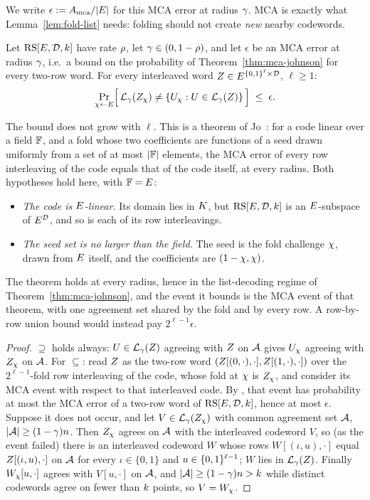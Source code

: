 We write $\epsilon := A_{\mathrm{mca}}/|E|$ for this MCA error at radius $\gamma$. MCA is exactly what Lemma~\ref{lem:fold-list} needs: folding should not create \emph{new} nearby codewords.

\begin{lemma}\label{lem:fold-list}
Let $\mathrm{RS}[E,\mathcal{D},k]$ have rate $\rho$, let $\gamma \in (0, 1-\rho)$, and let $\epsilon$ be an MCA error at radius $\gamma$, i.e.\ a bound on the probability of Theorem~\ref{thm:mca-johnson} for every two-row word. For every interleaved word $Z \in E^{\{0,1\}^{\ell} \times \mathcal{D}}$, $\ell \ge 1$:
\[
\Pr_{\chi \leftarrow E}\Bigl[\, \mathcal{L}_\gamma(Z_\chi) \neq \{ U_\chi : U \in \mathcal{L}_\gamma(Z) \} \,\Bigr] \;\le\; \epsilon .
\]
\end{lemma}

The bound does not grow with $\ell$. This is a theorem of Jo~\cite[Thm.~4.4]{Jo26}: for a code linear over a field $\mathbb{F}$, and a fold whose two coefficients are functions of a seed drawn uniformly from a set of at most $|\mathbb{F}|$ elements, the MCA error of every row interleaving of the code equals that of the code itself, at every radius. Both hypotheses hold here, with $\mathbb{F} = E$:
\begin{itemize}[itemsep=1pt]
\item \emph{The code is $E$-linear.} Its domain lies in $K$, but $\mathrm{RS}[E,\mathcal{D},k]$ is an $E$-subspace of $E^{\mathcal{D}}$, and so is each of its row interleavings.
\item \emph{The seed set is no larger than the field.} The seed is the fold challenge $\chi$, drawn from $E$ itself, and the coefficients are $(1-\chi, \chi)$.
\end{itemize}
The theorem holds at every radius, hence in the list-decoding regime of Theorem~\ref{thm:mca-johnson}, and the event it bounds is the MCA event of that theorem, with one agreement set shared by the fold and by every row. A row-by-row union bound would instead pay $2^{\ell-1}\epsilon$.

\begin{proof}
$\supseteq$ holds always: $U \in \mathcal{L}_\gamma(Z)$ agreeing with $Z$ on $\mathcal{A}$ gives $U_\chi$ agreeing with $Z_\chi$ on $\mathcal{A}$. For $\subseteq$: read $Z$ as the two-row word $(Z[(0,\cdot),\cdot], Z[(1,\cdot),\cdot])$ over the $2^{\ell-1}$-fold row interleaving of the code, whose fold at $\chi$ is $Z_\chi$, and consider its MCA event with respect to that interleaved code. By \cite[Thm.~4.4]{Jo26}, that event has probability at most the MCA error of a two-row word of $\mathrm{RS}[E,\mathcal{D},k]$, hence at most $\epsilon$. Suppose it does not occur, and let $V \in \mathcal{L}_\gamma(Z_\chi)$ with common agreement set $\mathcal{A}$, $|\mathcal{A}| \ge (1-\gamma)n$. Then $Z_\chi$ agrees on $\mathcal{A}$ with the interleaved codeword $V$, so (as the event failed) there is an interleaved codeword $W$ whose rows $W[(\iota,u),\cdot]$ equal $Z[(\iota,u),\cdot]$ on $\mathcal{A}$ for every $\iota \in \{0,1\}$ and $u \in \{0,1\}^{\ell-1}$; $W$ lies in $\mathcal{L}_\gamma(Z)$. Finally $W_\chi[u,\cdot]$ agrees with $V[u,\cdot]$ on $\mathcal{A}$, and $|\mathcal{A}| \ge (1-\gamma)n > k$ while distinct codewords agree on fewer than $k$ points, so $V = W_\chi$.
\end{proof}

